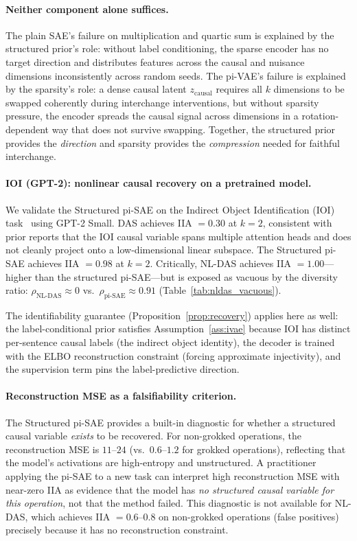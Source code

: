 \paragraph{Neither component alone suffices.}
The plain SAE's failure on multiplication and quartic sum is explained by the
structured prior's role: without label conditioning, the sparse encoder has no
target direction and distributes features across the causal and nuisance
dimensions inconsistently across random seeds.  The pi-VAE's failure is
explained by the sparsity's role: a dense causal latent $z_\text{causal}$
requires all $k$ dimensions to be swapped coherently during interchange
interventions, but without sparsity pressure, the encoder spreads the causal
signal across dimensions in a rotation-dependent way that does not survive
swapping.  Together, the structured prior provides the \emph{direction} and
sparsity provides the \emph{compression} needed for faithful interchange.

\paragraph{IOI (GPT-2): nonlinear causal recovery on a pretrained model.}
We validate the Structured pi-SAE on the Indirect Object Identification (IOI)
task~\citep{wang2022interpretability} using GPT-2 Small.  DAS achieves IIA $=
0.30$ at $k=2$, consistent with prior reports that the IOI causal variable
spans multiple attention heads and does not cleanly project onto a
low-dimensional linear subspace.  The Structured pi-SAE achieves IIA $= 0.98$
at $k=2$.  Critically, NL-DAS achieves IIA $= 1.00$---higher than the
structured pi-SAE---but is exposed as vacuous by the diversity ratio:
$\rho_\text{NL-DAS} \approx 0$ vs.\ $\rho_\text{pi-SAE} \approx 0.91$
(Table~\ref{tab:nldas_vacuous}).

The identifiability guarantee (Proposition~\ref{prop:recovery}) applies here
as well: the label-conditional prior satisfies Assumption~\ref{ass:ivae}
because IOI has distinct per-sentence causal labels (the indirect object
identity), the decoder is trained with the ELBO reconstruction constraint
(forcing approximate injectivity), and the supervision term pins the
label-predictive direction.

\paragraph{Reconstruction MSE as a falsifiability criterion.}
The Structured pi-SAE provides a built-in diagnostic for whether a structured
causal variable \emph{exists} to be recovered.  For non-grokked operations,
the reconstruction MSE is $11$--$24$ (vs.\ $0.6$--$1.2$ for grokked
operations), reflecting that the model's activations are high-entropy and
unstructured.  A practitioner applying the pi-SAE to a new task can
interpret high reconstruction MSE with near-zero IIA as evidence that the
model has \emph{no structured causal variable for this operation}, not that
the method failed.  This diagnostic is not available for NL-DAS, which
achieves IIA $= 0.6$--$0.8$ on non-grokked operations (false positives)
precisely because it has no reconstruction constraint.

